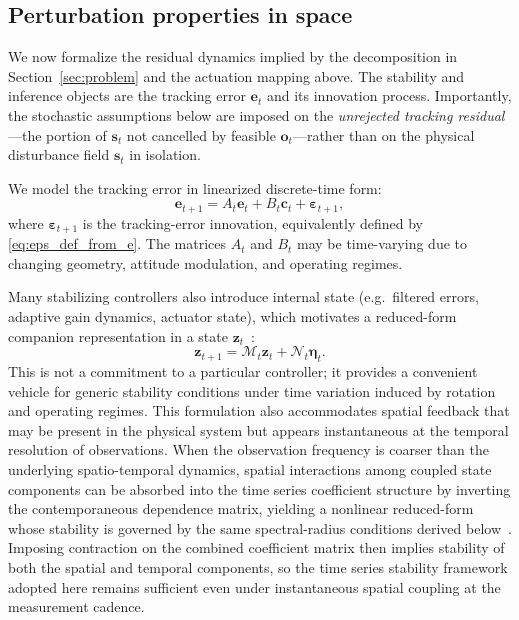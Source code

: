 \documentclass{article}
\begin{document}
\subsection{Perturbation properties in space}
\label{sec:perturbations_properties}

We now formalize the residual dynamics implied by the decomposition in Section~\ref{sec:problem} and the actuation mapping above.
The stability and inference objects are the tracking error $\mathbf{e}_t$ and its innovation process. Importantly, the stochastic
assumptions below are imposed on the \emph{unrejected tracking residual}---the portion of $\mathbf{s}_t$ not cancelled by feasible
$\mathbf{o}_t$---rather than on the physical disturbance field $\mathbf{s}_t$ in isolation.

We model the tracking error in linearized discrete-time form:
\begin{equation}
\mathbf{e}_{t+1} = A_t\mathbf{e}_t + B_t\mathbf{c}_t + \boldsymbol{\varepsilon}_{t+1},
\label{eq:closed_loop_generic}
\end{equation}
where $\boldsymbol{\varepsilon}_{t+1}$ is the tracking-error innovation, equivalently defined by \eqref{eq:eps_def_from_e}.
The matrices $A_t$ and $B_t$ may be time-varying due to changing geometry, attitude modulation, and operating regimes.

Many stabilizing controllers also introduce internal state (e.g.\ filtered errors, adaptive gain dynamics, actuator state), which
motivates a reduced-form companion representation in a state $\mathbf{z}_t$~\cite{hamilton1994,lutkepohl2005}:
\begin{equation}
\mathbf{z}_{t+1} = \mathcal{M}_t\mathbf{z}_t + \mathcal{N}_t \boldsymbol{\eta}_t.
\label{eq:tv_state}
\end{equation}
This is not a commitment to a particular controller; it provides a convenient vehicle for generic stability conditions under time
variation induced by rotation and operating regimes. This formulation also accommodates spatial feedback that may be present in the physical system but appears instantaneous at the temporal resolution of observations. When the observation frequency is coarser than the underlying spatio-temporal dynamics, spatial interactions among coupled state components can be absorbed into the time series coefficient structure by inverting the contemporaneous dependence matrix, yielding a nonlinear reduced-form whose stability is governed by the same spectral-radius conditions derived below~\cite{andree2020dynamic}. Imposing contraction on the combined coefficient matrix then implies stability of both the spatial and temporal components, so the time series stability framework adopted here remains sufficient even under instantaneous spatial coupling at the measurement cadence.
\end{document}
